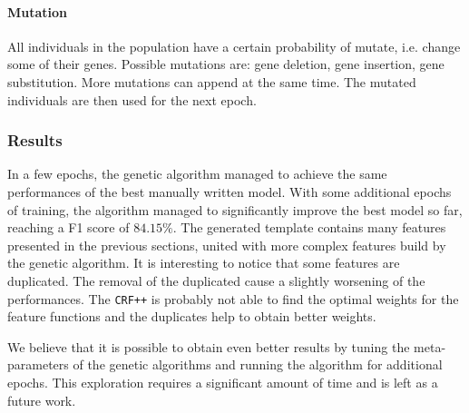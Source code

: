\paragraph{Mutation}
All individuals in the population have a certain probability of mutate, i.e. change some of their genes.
Possible mutations are: gene deletion, gene insertion, gene substitution.
More mutations can append at the same time.
The mutated individuals are then used for the next epoch.

\subsubsection{Results}
In a few epochs, the genetic algorithm managed to achieve the same performances of the best manually written model.
With some additional epochs of training, the algorithm managed to significantly improve the best model so far, reaching a F1 score of $84.15\%$.
The generated template contains many features presented in the previous sections, united with more complex features build by the genetic algorithm.
It is interesting to notice that some features are duplicated.
The removal of the duplicated cause a slightly worsening of the performances.
The \texttt{CRF++} is probably not able to find the optimal weights for the feature functions and the duplicates help to obtain better weights. 

We believe that it is possible to obtain even better results by tuning the meta-parameters of the genetic algorithms and running the algorithm for additional epochs.
This exploration requires a significant amount of time and is left as a future work.
